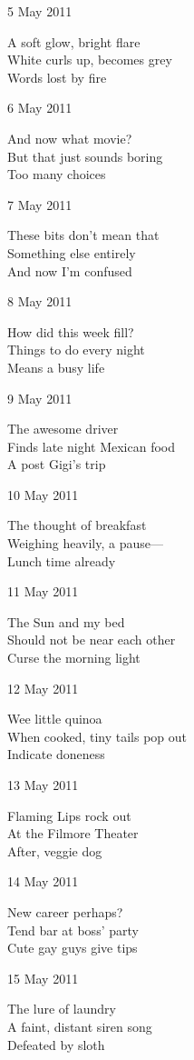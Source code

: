 \documentclass[12pt]{article}
\begin{document}
5 May 2011

A soft glow, bright flare \\
White curls up, becomes grey \\
Words lost by fire

6 May 2011

And now what movie? \\
But that just sounds boring \\
Too many choices

7 May 2011

These bits don't mean that \\
Something else entirely \\
And now I'm confused

8 May 2011

How did this week fill? \\
Things to do every night \\
Means a busy life

9 May 2011

The awesome driver \\
Finds late night Mexican food \\
A post Gigi's trip

\newpage

10 May 2011

The thought of breakfast \\
Weighing heavily, a pause--- \\
Lunch time already

11 May 2011

The Sun and my bed \\
Should not be near each other \\
Curse the morning light

12 May 2011

Wee little quinoa \\
When cooked, tiny tails pop out \\
Indicate doneness

13 May 2011

Flaming Lips rock out \\
At the Filmore Theater \\
After, veggie dog

14 May 2011

New career perhaps? \\
Tend bar at boss' party \\
Cute gay guys give tips

15 May 2011

The lure of laundry \\
A faint, distant siren song \\
Defeated by sloth
\end{document}
